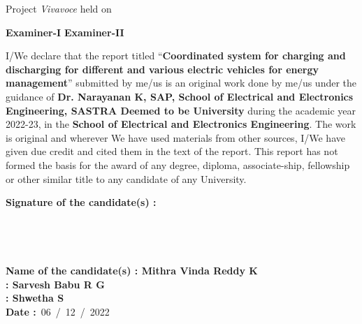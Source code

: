 \documentclass[a4paper, 12pt, oneside]{sastra}
\begin{document}
	\noindent Project \textit{Vivavoce} held on
	
	\vspace*{0.50in}
	\noindent \textbf{Examiner-I} \hspace*{120mm} \textbf{Examiner-II}
	
	
	\declaration
	
		
		\begin{doublespace}
		\linespread{2}
		
		I/We declare that the report titled ``\textbf{Coordinated system for charging and discharging for different and various electric vehicles for energy management}'' submitted by me/us is an original work done by me/us under the guidance of \textbf{Dr. Narayanan K, SAP, School of Electrical and Electronics Engineering, SASTRA Deemed to be University} during the academic year 2022-23, in the \textbf{School of Electrical and Electronics Engineering}. The work is original and wherever We have used materials from other sources, I/We have given due credit and cited them in the text of the report. This report has not formed the basis for the award of any degree, diploma, associate-ship, fellowship or other similar title to any candidate of any University.\\
		
	\end{doublespace}
	\noindent \textbf{Signature of the candidate(s)	:}	
	\\
	\\
	\\
	\\
	\\
	\noindent\textbf{Name of the candidate(s)\hspace{7mm}		: Mithra Vinda Reddy K}\\
	\hspace*{53mm}\textbf{: Sarvesh Babu R G}\\
	\hspace*{53mm}\textbf{: Shwetha S}\\
	\noindent\textbf{Date\hspace*{43.5mm}					:}~06~/~12~/~2022\\%
	
	\acknowledgements
	
\end{document}
